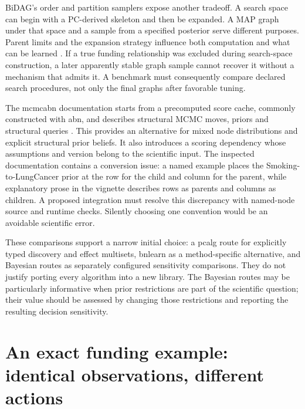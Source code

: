 BiDAG's order and partition samplers expose another tradeoff. A search space
can begin with a PC-derived skeleton and then be expanded. A MAP graph under
that space and a sample from a specified posterior serve different purposes.
Parent limits and the expansion strategy influence both computation and what
can be learned \citep{exec13_bidag}. If a true funding relationship was
excluded during search-space construction, a later apparently stable graph
sample cannot recover it without a mechanism that admits it. A benchmark
must consequently compare declared search procedures, not only the final
graphs after favorable tuning.

The mcmcabn documentation starts from a precomputed score cache, commonly
constructed with abn, and describes structural MCMC moves, priors and
structural queries \citep{exec13_mcmcabn}. This provides an alternative for
mixed node distributions and explicit structural prior beliefs. It also
introduces a scoring dependency whose assumptions and version belong to the
scientific input. The inspected documentation contains a conversion issue:
a named example places the Smoking-to-LungCancer prior at the row for the
child and column for the parent, while explanatory prose in the vignette
describes rows as parents and columns as children. A proposed integration
must resolve this discrepancy with named-node source and runtime checks.
Silently choosing one convention would be an avoidable scientific error.

These comparisons support a narrow initial choice: a pcalg route for explicitly
typed discovery and effect multisets, bnlearn as a method-specific alternative,
and Bayesian routes as separately configured sensitivity comparisons.
They do not justify porting every algorithm into a new library. The Bayesian
routes may be particularly informative when prior restrictions are part of
the scientific question; their value should be assessed by changing those
restrictions and reporting the resulting decision sensitivity.

\section{An exact funding example: identical observations, different actions}

